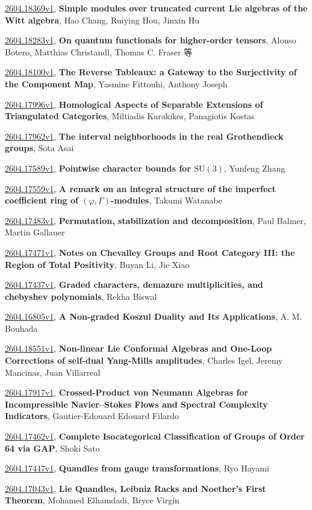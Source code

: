\documentclass[9pt, a4paper]{article}
\theoremstyle{plain}
\theoremstyle{definition}
\theoremstyle{remark}
\newcommand{\arxiv}[3]{\href{https://arxiv.org/abs/#1}{#1}, \textbf{\textcolor{arxivblue}{#2}}, #3}
\begin{document}
\arxiv{2604.18369v1}{Simple modules over truncated current Lie algebras of the Witt algebra}{Hao Chang, Ruiying Hou, Jinxin Hu}

\arxiv{2604.18283v1}{On quantum functionals for higher-order tensors}{Alonso Botero, Matthias Christandl, Thomas C. Fraser 等}

\arxiv{2604.18100v1}{The Reverse Tableaux: a Gateway to the Surjectivity of the Component Map}{Yasmine Fittouhi, Anthony Joseph}

\arxiv{2604.17996v1}{Homological Aspects of Separable Extensions of Triangulated Categories}{Miltiadis Karakikes, Panagiotis Kostas}

\arxiv{2604.17962v1}{The interval neighborhoods in the real Grothendieck groups}{Sota Asai}

\arxiv{2604.17589v1}{Pointwise character bounds for $\mathrm{SU}(3)$}{Yunfeng Zhang}

\arxiv{2604.17559v1}{A remark on an integral structure of the imperfect coefficient ring of $(\varphi,Γ)$-modules}{Takumi Watanabe}

\arxiv{2604.17483v1}{Permutation, stabilization and decomposition}{Paul Balmer, Martin Gallauer}

\arxiv{2604.17471v1}{Notes on Chevalley Groups and Root Category III: the Region of Total Positivity}{Buyan Li, Jie Xiao}

\arxiv{2604.17437v1}{Graded characters, demazure multiplicities, and chebyshev polynomials}{Rekha Biswal}

\arxiv{2604.16805v1}{A Non-graded Koszul Duality and Its Applications}{A. M. Bouhada}

\arxiv{2604.18551v1}{Non-linear Lie Conformal Algebras and One-Loop Corrections of self-dual Yang-Mills amplitudes}{Charles Igel, Jeremy Mancinas, Juan Villarreal}

\arxiv{2604.17917v1}{Crossed-Product von Neumann Algebras for Incompressible Navier--Stokes Flows and Spectral Complexity Indicators}{Gautier-Edouard Edouard Filardo}

\arxiv{2604.17462v1}{Complete Isocategorical Classification of Groups of Order 64 via GAP}{Shoki Sato}

\arxiv{2604.17447v1}{Quandles from gauge transformations}{Ryo Hayami}

\arxiv{2604.17043v1}{Lie Quandles, Leibniz Racks and Noether's First Theorem}{Mohamed Elhamdadi, Bryce Virgin}

\end{document}
